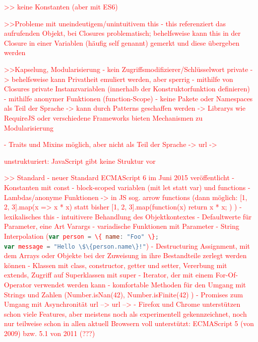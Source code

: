 \documentclass[a4paper, 12pt, hidelinks, listof=totoc, listoftables=totoc, bibliography=totoc]{scrreprt}
\newcommand{\js}[1]{\lstinline[language=JavaScript, style=inline]|#1|}
\newcommand{\TODO}[1]{\textcolor{red}{#1}\newline}
\begin{document}
\TODO{>> keine Konstanten (aber mit ES6)}

\TODO{>>Probleme mit uneindeutigem/unintuitivem this}
\TODO{- this referenziert das aufrufenden Objekt, bei Closures problematisch; behelfsweise kann this in der Closure in einer Variablen (häufig self genannt) gemerkt und diese übergeben werden}

\TODO{>>Kapselung, Modularisierung}
\TODO{- kein Zugriffsmodifizierer/Schlüsselwort private}
\TODO{-> behelfsweise kann Privatheit emuliert werden, aber sperrig}
\TODO{	- mithilfe von Closures private Instanzvariablen (innerhalb der Konstruktorfunktion definieren)}
\TODO{	- mithilfe anonymer Funktionen (function-Scope)}
\TODO{- keine Pakete oder Namespaces als Teil der Sprache}
\TODO{-> kann durch Patterns geschaffen werden}
\TODO{-> Librarys wie RequireJS oder verschiedene Frameworks bieten Mechanismen zu Modularisierung}

\TODO{- Traits und Mixins möglich, aber nicht als Teil der Sprache -> url -> %
}

\TODO{unstrukturiert: JavaScript gibt keine Struktur vor}


\TODO{>> Standard}
\TODO{- neuer Standard ECMAScript 6 im Juni 2015 veröffentlicht}
\TODO{	- Konstanten mit const}
\TODO{	- block-scoped variablen (mit let statt var) und functions}
\TODO{	- Lambdas/anonyme Funktionen -> in JS sog. arrow functions (dann möglich: [1, 2, 3].map(x => x * x) statt bisher [1, 2, 3].map(function(x) { return x * x; }) )}
\TODO{	- lexikalisches this - intuitivere Behandlung des Objektkontextes}
\TODO{	- Defaultwerte für Parameter, eine Art Varargs}
\TODO{	- variadische Funktionen mit Parameter}
\TODO{	- String Interpolation (\js{var person = \{ name: "Foo" \};} \\ \js{var message = "Hello \$\{person.name\}!"})}
\TODO{	- Destructuring Assignment, mit dem Arrays oder Objekte bei der Zuweisung in ihre Bestandteile zerlegt werden können}
\TODO{	- Klassen mit class, constructor, getter und setter, Vererbung mit extends, Zugriff auf Superklassen mit super}
\TODO{	- Iterator, der mit einem For-Of-Operator verwendet werden kann}
\TODO{	- komfortable Methoden für den Umgang mit Strings und Zahlen (Number.isNan(42), Number.isFinite(42) )}
\TODO{	- Promises zum Umgang mit Asynchronität}
\TODO{	url -->  %
}
\TODO{	url -->  %
}
\TODO{- Firefox und Chrome unterstützen schon viele Features, aber meistens noch als experimentell gekennzeichnet, noch nur teilweise schon in allen aktuell Browsern voll unterstützt: ECMAScript 5 (von 2009) bzw. 5.1 von 2011 (???)}
\end{document}
